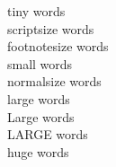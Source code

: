\documentclass{article}
\begin{document}
{\tiny tiny words}  \\
{\scriptsize scriptsize words}\\  
{\footnotesize footnotesize words}\\  
{\small small words}  \\
{\normalsize normalsize words}\\  
{\large large words}  \\
{\Large Large words} \\
{\LARGE LARGE words} \\
{\huge huge words}  
\end{document}
